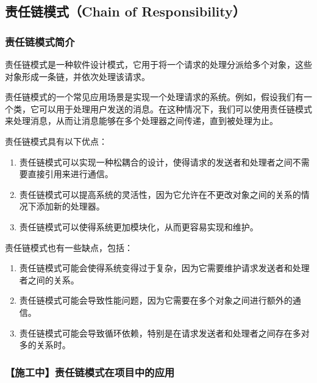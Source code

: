 \subsection{责任链模式（Chain of Responsibility）}

\subsubsection{责任链模式简介}

责任链模式是一种软件设计模式，它用于将一个请求的处理分派给多个对象，这些对象形成一条链，并依次处理该请求。

责任链模式的一个常见应用场景是实现一个处理请求的系统。例如，假设我们有一个类，它可以用于处理用户发送的消息。在这种情况下，我们可以使用责任链模式来处理消息，从而让消息能够在多个处理器之间传递，直到被处理为止。

责任链模式具有以下优点：
\begin{enumerate}
\item 责任链模式可以实现一种松耦合的设计，使得请求的发送者和处理者之间不需要直接引用来进行通信。
\item 责任链模式可以提高系统的灵活性，因为它允许在不更改对象之间的关系的情况下添加新的处理器。
\item 责任链模式可以使得系统更加模块化，从而更容易实现和维护。
\end{enumerate}

责任链模式也有一些缺点，包括：
\begin{enumerate}
\item 责任链模式可能会使得系统变得过于复杂，因为它需要维护请求发送者和处理者之间的关系。
\item 责任链模式可能会导致性能问题，因为它需要在多个对象之间进行额外的通信。
\item 责任链模式可能会导致循环依赖，特别是在请求发送者和处理者之间存在多对多的关系时。
\end{enumerate}

\subsubsection{【施工中】责任链模式在项目中的应用}